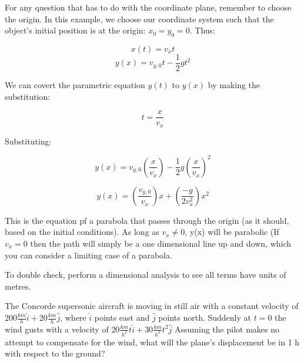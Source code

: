 \begin{solution}
For any question that has to do with the coordinate plane, remember to choose the origin. In this example, we choose our coordinate system such that the object's initial position is at the origin: $x_0=y_0=0$. Thus:

\begin{equation*} x(t)=v_xt\end{equation*}
\begin{equation*} y(x)=v_{y,0}t-\frac{1}{2}gt^2\end{equation*}

We can covert the parametric equation $y(t)$ to $y(x)$ by making the substitution:

\begin{equation*} t=\frac{x}{v_x} \end{equation*}

Substituting: 

\begin{equation*}
    y(x) = v_{y,0}(\frac{x}{v_x})-\frac{1}{2}g(\frac{x}{v_x})^2
\end{equation*}

\begin{equation*}
    y(x) = (\frac{v_{y,0}}{v_x})x+(\frac{-g}{2v_x^2})x^2
\end{equation*}

This is the equation pf a parabola that passes through the origin (as it should, based on the initial conditions). As long as $v_x \neq 0$, y(x) will be parabolic (If $v_x = 0$ then the path will simply be a one dimensional line up and down, which you can consider a limiting case of a parabola.

To double check, perform a dimensional analysis to see all terms have units of metres.

\end{solution}


\begin{question}
The Concorde supersonic aircraft is moving in still air with a constant velocity of $200\frac{km}{h}\hat{i}+20\frac{km}{h}\hat{j}$, where $\hat{i}$ points east and $\hat{j}$ points north. Suddenly at $t=0$ the wind gusts with a velocity of $20\frac{km}{h^2}t\hat{i}+30\frac{km}{h^3}t^2\hat{j}$ Assuming the pilot makes no attempt to compensate for the wind, what will the plane's displacement be in 1 h with respect to the ground?
\end{question}

